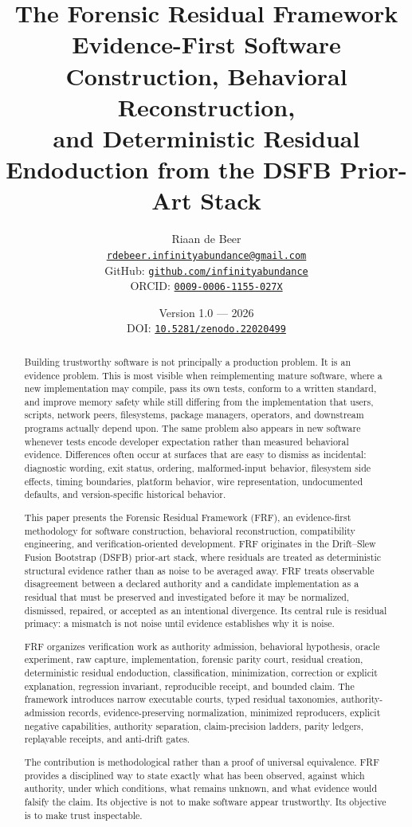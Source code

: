 \documentclass[11pt,a4paper]{article}
\title{\textbf{The Forensic Residual Framework}\\
\large Evidence-First Software Construction, Behavioral Reconstruction,\\
and Deterministic Residual Endoduction from the DSFB Prior-Art Stack}
\author{Riaan de Beer\\
\small \href{mailto:rdebeer.infinityabundance@gmail.com}{\texttt{rdebeer.infinityabundance@gmail.com}}\\
\small GitHub: \href{https://github.com/infinityabundance}{\texttt{github.com/infinityabundance}}\\
\small ORCID: \href{https://orcid.org/0009-0006-1155-027X}{\texttt{0009-0006-1155-027X}}}
\date{Version 1.0 --- 2026\\
\small DOI: \href{https://doi.org/10.5281/zenodo.22020499}{\texttt{10.5281/zenodo.22020499}}}
\newcommand{\frf}{\textsc{FRF}}
\newcommand{\dsfb}{\textsc{DSFB}}
\begin{document}
\maketitle

\begin{abstract}
Building trustworthy software is not principally a production problem. It is an evidence problem. This is most visible when reimplementing mature software, where a new implementation may compile, pass its own tests, conform to a written standard, and improve memory safety while still differing from the implementation that users, scripts, network peers, filesystems, package managers, operators, and downstream programs actually depend upon. The same problem also appears in new software whenever tests encode developer expectation rather than measured behavioral evidence. Differences often occur at surfaces that are easy to dismiss as incidental: diagnostic wording, exit status, ordering, malformed-input behavior, filesystem side effects, timing boundaries, platform behavior, wire representation, undocumented defaults, and version-specific historical behavior.

This paper presents the Forensic Residual Framework (\frf), an evidence-first methodology for software construction, behavioral reconstruction, compatibility engineering, and verification-oriented development. \frf{} originates in the Drift--Slew Fusion Bootstrap (\dsfb) prior-art stack, where residuals are treated as deterministic structural evidence rather than as noise to be averaged away. \frf{} treats observable disagreement between a declared authority and a candidate implementation as a residual that must be preserved and investigated before it may be normalized, dismissed, repaired, or accepted as an intentional divergence. Its central rule is residual primacy: a mismatch is not noise until evidence establishes why it is noise.

\frf{} organizes verification work as authority admission, behavioral hypothesis, oracle experiment, raw capture, implementation, forensic parity court, residual creation, deterministic residual endoduction, classification, minimization, correction or explicit explanation, regression invariant, reproducible receipt, and bounded claim. The framework introduces narrow executable courts, typed residual taxonomies, authority-admission records, evidence-preserving normalization, minimized reproducers, explicit negative capabilities, authority separation, claim-precision ladders, parity ledgers, replayable receipts, and anti-drift gates.

The contribution is methodological rather than a proof of universal equivalence. \frf{} provides a disciplined way to state exactly what has been observed, against which authority, under which conditions, what remains unknown, and what evidence would falsify the claim. Its objective is not to make software appear trustworthy. Its objective is to make trust inspectable.
\end{abstract}
\end{document}
